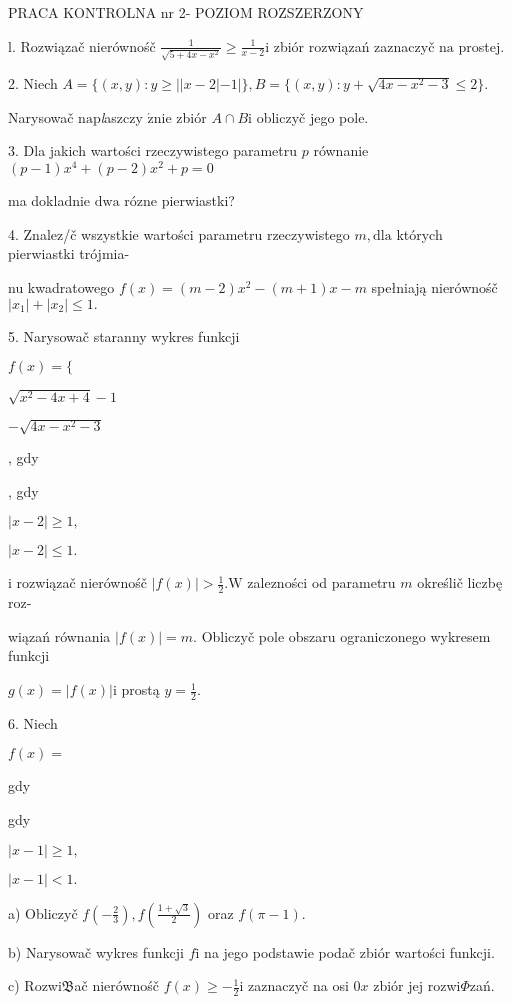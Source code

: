 \documentclass[a4paper,12pt]{article}
\begin{document}
PRACA KONTROLNA nr 2- POZIOM ROZSZERZONY

l. Rozwiązač nierównośč $\displaystyle \frac{1}{\sqrt{5+4x-x^{2}}}\geq\frac{1}{x-2} \mathrm{i}$ zbiór rozwiązań zaznaczyč $\mathrm{n}\mathrm{a}$ prostej.

2. Niech $A=\{(x,y):y\geq||x-2|-1|\}, B=\{(x,y):y+\sqrt{4x-x^{2}-3}\leq 2\}.$

Narysowač $\mathrm{n}\mathrm{a}\mathrm{p}${\it l}aszczy $\acute{\mathrm{z}}\mathrm{n}\mathrm{i}\mathrm{e}$ zbiór $A\cap B\mathrm{i}$ obliczyč jego pole.

3. Dla jakich wartości rzeczywistego parametru $p$ równanie $(p-1)x^{4}+(p-2)x^{2}+p=0$

ma dokladnie $\mathrm{d}\mathrm{w}\mathrm{a}$ rózne pierwiastki?

4. Znalez/č wszystkie wartości parametru rzeczywistego $m, \mathrm{d}\mathrm{l}\mathrm{a}$ których pierwiastki trójmia-

nu kwadratowego $f(x)=(m-2)x^{2}-(m+1)x-m$ spełniają nierównośč $|x_{1}|+|x_{2}|\leq 1.$

5. Narysowač staranny wykres funkcji

$f(x)=\{$

$\sqrt{x^{2}-4x+4}-1$

$-\sqrt{4x-x^{2}-3}$

, gdy

, gdy

$|x-2|\geq 1,$

$|x-2|\leq 1.$

$\mathrm{i}$ rozwiązač nierównośč $|f(x)| > \displaystyle \frac{1}{2}. \mathrm{W}$ zalezności od parametru $m$ określič liczbę roz-

wiązań równania $|f(x)| =m$. Obliczyč pole obszaru ograniczonego wykresem funkcji

$g(x)=|f(x)|\mathrm{i}$ prostą $y=\displaystyle \frac{1}{2}.$

6. Niech

$f(x)=$

gdy

gdy

$|x-1|\geq 1,$

$|x-1|<1.$

a) Obliczyč $f(-\displaystyle \frac{2}{3}), f(\displaystyle \frac{1+\sqrt{3}}{2})$ oraz $f(\pi-1).$

b) Narysowač wykres funkcji $f\mathrm{i}$ na jego podstawie podač zbiór wartości funkcji.

c) Rozwi$\mathfrak{B}$ač nierównośč $f(x)\displaystyle \geq-\frac{1}{2}\mathrm{i}$ zaznaczyč na osi $0x$ zbiór jej rozwi$\Phi$zań.
\end{document}
